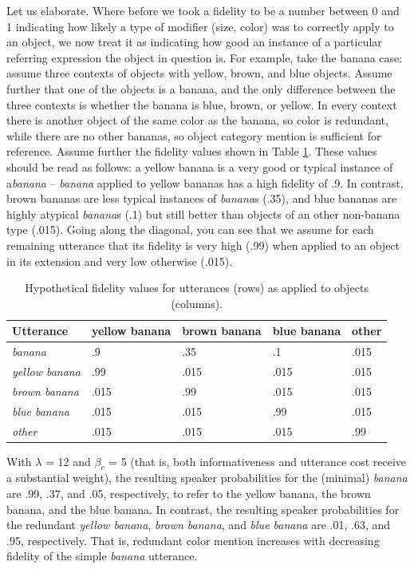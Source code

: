 \documentclass[11pt]{article}
\newcommand{\tableref}[1]{Table \ref{#1}}
\begin{document}
Let us elaborate. Where before we took a fidelity to be a number between 0 and 1 indicating how likely a type of modifier (size, color) was to correctly apply to an object, we now treat it as indicating how good an instance of a particular referring expression the object in question is. For example, take the banana case: assume three contexts of objects with yellow, brown, and blue objects. Assume further that one of the objects is a banana, and the only difference between the three contexts is whether the banana is blue, brown, or yellow. In every context there is another object of the same color as the banana, so color is redundant, while there are no other bananas, so object category mention is sufficient for reference. Assume further the fidelity values shown in \tableref{tab:colorobjectfidelities}. These values should be read as follows: a yellow banana is a very good or typical instance of a\emph{banana} -- \emph{banana} applied to yellow bananas has a high fidelity of .9. In contrast, brown bananas are less typical instances of \emph{banana}s (.35), and blue bananas are highly atypical \emph{banana}s (.1) but still better than objects of an other non-banana type (.015). Going along the diagonal, you can see that we assume for each remaining utterance that its fidelity is very high (.99) when applied to an object in its extension and very low otherwise (.015).

\begin{table}
\centering
\caption{Hypothetical fidelity values for utterances (rows) as applied to objects (columns).}
\begin{tabular}{l l l l l}
\toprule
Utterance & yellow banana & brown banana & blue banana & other\\
\midrule
\emph{banana} & .9 & .35 & .1 & .015 \\
\emph{yellow banana} & .99 & .015 & .015 & .015 \\
\emph{brown banana} & .015 & .99 & .015 & .015 \\
\emph{blue banana} & .015 & .015 & .99 & .015 \\
\emph{other} & .015 & .015 & .015 & .99 \\
\bottomrule
\end{tabular}
\label{tab:colorobjectfidelities}
\end{table}

With $\lambda$ = 12 and $\beta_c$ = 5 (that is, both informativeness and utterance cost receive a substantial weight), the resulting speaker probabilities for the (minimal) \emph{banana} are .99, .37, and .05, respectively, to refer to the yellow banana, the brown banana, and the blue banana. In contrast, the resulting speaker probabilities for the redundant \emph{yellow banana}, \emph{brown banana}, and \emph{blue banana} are .01, .63, and .95, respectively. That is, redundant color mention increases with decreasing fidelity of the simple \emph{banana} utterance.
\end{document}
